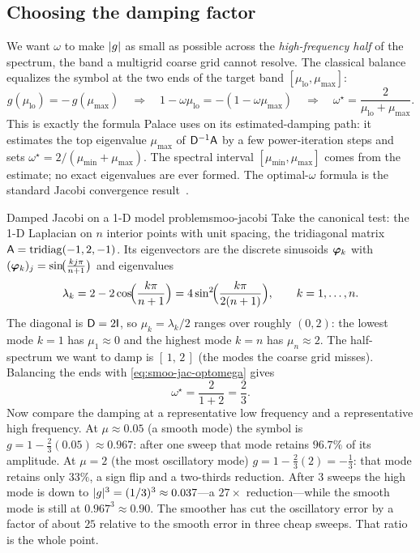 \subsection{Choosing the damping factor}

We want $\omega$ to make $\lvert g\rvert$ as small as possible across the
\emph{high-frequency half} of the spectrum, the band a multigrid coarse grid cannot
resolve. The classical balance equalizes the symbol at the two ends of the target
band $[\mu_{\mathrm{lo}}, \mu_{\max}]$:
\begin{equation}
  g(\mu_{\mathrm{lo}}) = -\,g(\mu_{\max})
  \quad\Longrightarrow\quad
  1 - \omega\mu_{\mathrm{lo}} = -(1-\omega\mu_{\max})
  \quad\Longrightarrow\quad
  \omega^\star = \frac{2}{\mu_{\mathrm{lo}} + \mu_{\max}}.
  \label{eq:smoo-jac-optomega}
\end{equation}
This is exactly the formula Palace uses on its estimated-damping path: it estimates
the top eigenvalue $\mu_{\max}$ of $\mathsf{D}^{-1}\mathsf{A}$ by a few power-iteration
steps and sets $\omega^\star = 2/(\mu_{\min} + \mu_{\max})$. The spectral interval
$[\mu_{\min},\mu_{\max}]$ comes from the estimate; no exact eigenvalues are ever
formed. The optimal-$\omega$ formula is the standard Jacobi convergence
result~\citep[\S4.1]{saad2003}.

\begin{workedexample}{Damped Jacobi on a 1-D model problem}{smoo-jacobi}
Take the canonical test: the 1-D Laplacian on $n$ interior points with unit
spacing, the tridiagonal matrix $\mathsf{A}=\operatorname{tridiag}(-1,2,-1)$. Its
eigenvectors are the discrete sinusoids $\boldsymbol{\varphi}_k$ with
$(\boldsymbol{\varphi}_k)_j = \sin\!\bigl(\tfrac{k j\pi}{n+1}\bigr)$ and eigenvalues
\[
  \lambda_k = 2 - 2\cos\!\Bigl(\frac{k\pi}{n+1}\Bigr)
            = 4\sin^2\!\Bigl(\frac{k\pi}{2(n+1)}\Bigr),
  \qquad k = 1,\dots,n.
\]
The diagonal is $\mathsf{D}=2\mathsf{I}$, so $\mu_k = \lambda_k/2$ ranges over roughly
$(0,2)$: the lowest mode $k=1$ has $\mu_1\approx 0$ and the highest mode $k=n$ has
$\mu_n\approx 2$. The half-spectrum we want to damp is $[\,1,\,2\,]$ (the modes the
coarse grid misses). Balancing the ends with \cref{eq:smoo-jac-optomega} gives
\[
  \omega^\star = \frac{2}{1 + 2} = \frac{2}{3}.
\]
Now compare the damping at a representative low frequency and a representative high
frequency. At $\mu \approx 0.05$ (a smooth mode) the symbol is
$g = 1 - \tfrac{2}{3}(0.05) \approx 0.967$: after one sweep that mode retains
$96.7\%$ of its amplitude. At $\mu = 2$ (the most oscillatory mode)
$g = 1 - \tfrac{2}{3}(2) = -\tfrac{1}{3}$: that mode retains only $33\%$, a sign
flip and a two-thirds reduction. After $3$ sweeps the high mode is down to
$\lvert g\rvert^3 = (1/3)^3 \approx 0.037$---a $27\times$ reduction---while the smooth mode
is still at $0.967^3 \approx 0.90$. The smoother has cut the oscillatory error by a
factor of about $25$ relative to the smooth error in three cheap sweeps. That ratio
is the whole point.
\end{workedexample}

